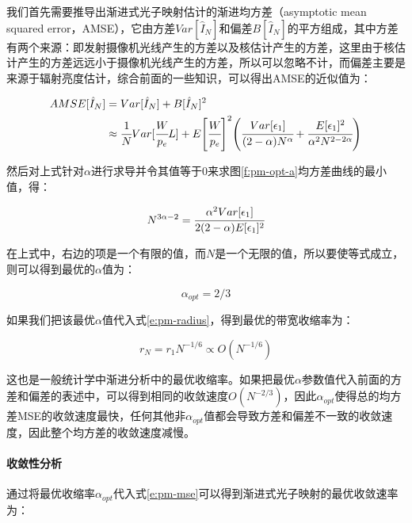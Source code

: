 我们首先需要推导出渐进式光子映射估计的渐进均方差（asymptotic mean squared error，AMSE），它由方差$Var[\hat{I}_N]$和偏差$B[\hat{I}_N]$的平方组成，其中方差有两个来源：即发射摄像机光线产生的方差以及核估计产生的方差，这里由于核估计产生的方差远远小于摄像机光线产生的方差，所以可以忽略不计，而偏差主要是来源于辐射亮度估计，综合前面的一些知识，可以得出AMSE的近似值为：

\begin{equation}\label{e:pm-mse}
\begin{aligned}
	AMSE[\hat{I}_N]&=Var[\hat{I}_N]+B[\hat{I}_N]^{2}\\
	&\approx \cfrac{1}{N}Var[ \cfrac{W}{p_e}L]+E\Biggl[ \cfrac{W}{p_e}\Biggl]^{2}\Biggl( \cfrac{Var[\epsilon_1]}{(2-\alpha)N^{\alpha}}+ \cfrac{E[\epsilon_1]^{2}}{\alpha^{2}N^{2-2\alpha}}\Biggl)
\end{aligned}
\end{equation}

然后对上式针对$\alpha$进行求导并令其值等于0来求图\ref{f:pm-opt-a}均方差曲线的最小值，得：

\begin{equation}
	N^{3\alpha-2}= \cfrac{\alpha^{2}Var[\epsilon_1]}{2(2-\alpha)E[\epsilon_1]^{2}}
\end{equation}

在上式中，右边的项是一个有限的值，而$N$是一个无限的值，所以要使等式成立，则可以得到最优的$\alpha$值为：

\begin{equation}
	\alpha_{opt}=2/3
\end{equation}

如果我们把该最优$\alpha$值代入式\ref{e:pm-radius}，得到最优的带宽收缩率为：

\begin{equation}
	r_N=r_1N^{-1/6}\propto O(N^{-1/6})
\end{equation}

这也是一般统计学中渐进分析中的最优收缩率。如果把最优$\alpha$参数值代入前面的方差和偏差的表述中，可以得到相同的收敛速度$O(N^{-2/3})$，因此$\alpha_{opt}$使得总的均方差MSE的收敛速度最快，任何其他非$\alpha_{opt}$值都会导致方差和偏差不一致的收敛速度，因此整个均方差的收敛速度减慢。





\paragraph{收敛性分析}
通过将最优收缩率$\alpha_{opt}$代入式\ref{e:pm-mse}可以得到渐进式光子映射的最优收敛速率为：

